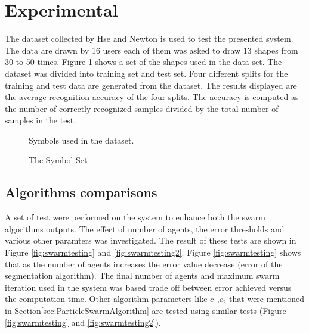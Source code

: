 \documentclass{article}
\begin{document}
\section{Experimental}
\label{sec:Experiments}
The dataset collected by Hse and Newton\cite{HeloiseBeautification} is used to test the presented system. The data are drawn by 16 users each of them was asked to draw 13 shapes from 30 to 50 times. Figure \ref{fig:symbolSet} shows a set of the shapes used in the data set. The dataset was divided into training set and test set. Four different splits for the training and test data are generated from the dataset. The results displayed are the average recognition accuracy of the four splits. The accuracy is computed as the number of correctly recognized samples divided by the total number of samples in the test. %
\begin{figure}
\centering 
\label{fig:symbolSet}
		\caption{The Symbol Set} Symbols used in the dataset.
\end{figure}
\subsection{Algorithms comparisons}
\label{sec:AlgExp}
A set of test were performed on the system to enhance both the swarm algorithms outputs. The effect of number of agents, the error thresholds and various other paramters was investigated. The result of these tests are shown in Figure \ref{fig:swarmtesting} and   \ref{fig:swarmtesting2}. Figure \ref{fig:swarmtesting} shows that as the number of agents increases the error value decrease (error of the segmentation algorithm). The final number of agents and maximum swarm iteration used in the system was based trade off between error achieved versus the computation time. Other algorithm parameters like $c_1$,$c_2$ that were mentioned in Section\ref{sec:ParticleSwarmAlgorithm} are tested using similar tests (Figure \ref{fig:swarmtesting} and \ref{fig:swarmtesting2}).
    
\end{document}

